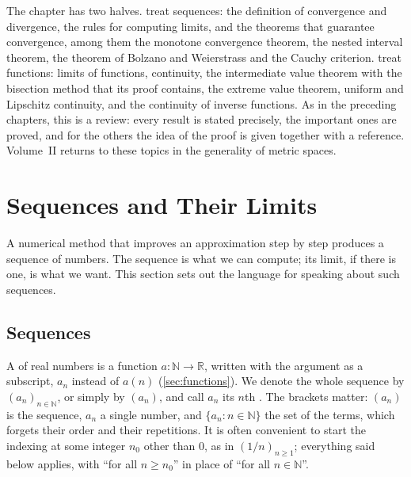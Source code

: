 The chapter has two halves.  treat sequences: the definition of convergence and divergence, the rules for computing limits, and the theorems that guarantee convergence, among them the monotone convergence theorem, the nested interval theorem, the theorem of Bolzano and Weierstrass and the Cauchy criterion.  treat functions: limits of functions, continuity, the intermediate value theorem with the bisection method that its proof contains, the extreme value theorem, uniform and Lipschitz continuity, and the continuity of inverse functions. As in the preceding chapters, this is a review: every result is stated precisely, the important ones are proved, and for the others the idea of the proof is given together with a reference. Volume~II returns to these topics in the generality of metric spaces.

\section{Sequences and Their Limits}
\label{sec:sequences}

A numerical method that improves an approximation step by step produces a sequence of numbers. The sequence is what we can compute; its limit, if there is one, is what we want. This section sets out the language for speaking about such sequences.

\subsection{Sequences}

A  of real numbers is a function $a\colon\mathbb N\to\mathbb R$, written with the argument as a subscript, $a_n$ instead of $a(n)$ (\cref{sec:functions}). We denote the whole sequence by $(a_n)_{n\in\mathbb N}$, or simply by $(a_n)$, and call $a_n$ its $n$th . The brackets matter: $(a_n)$ is the sequence, $a_n$ a single number, and $\{a_n: n\in\mathbb N\}$ the set of the terms, which forgets their order and their repetitions. It is often convenient to start the indexing at some integer $n_0$ other than $0$, as in $(1/n)_{n\ge1}$; everything said below applies, with ``for all $n\ge n_0$'' in place of ``for all $n\in\mathbb N$''.

